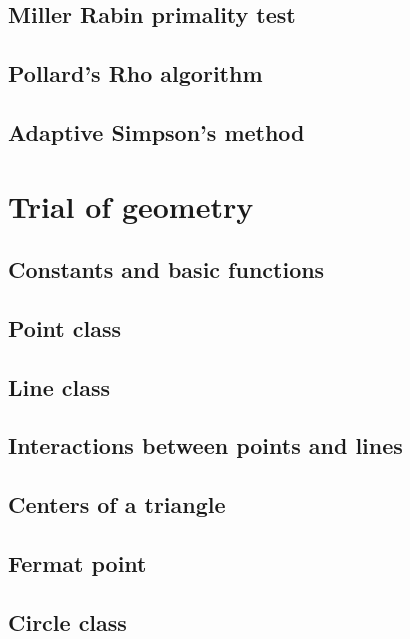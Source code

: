 \documentclass[UTF8,a4paper]{report}
\begin{document}
		\section{Miller Rabin primality test}
			
		\section{Pollard's Rho algorithm}
			
		\section{Adaptive Simpson's method}
			
	\chapter{Trial of geometry}
		\section{Constants and basic functions}
			
		\section{Point class}
			
		\section{Line class}
			
		\section{Interactions between points and lines}
			
		\section{Centers of a triangle}
			
		\section{Fermat point}
			
		\section{Circle class}
			
\end{document}
